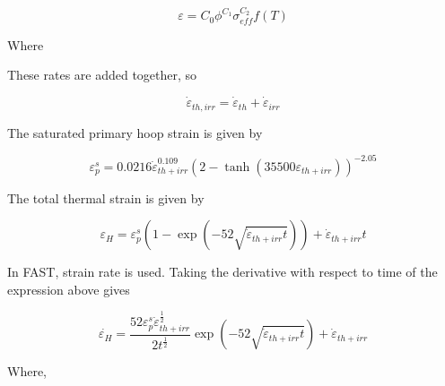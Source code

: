 \begin{equation}
    \label{eq:steady_state_irradiation_creep_rate}
    \varepsilon = C_{0}  \phi^{C_{1}}  \sigma^{C_{2}}_{eff}  f\left(T\right)
\end{equation}

Where


These rates are added together, so 

\begin{equation}
    \dot{\varepsilon}_{th,irr} = \dot{\varepsilon}_{th} + \dot{\varepsilon}_{irr}
    \label{eq:steady_state_total_creep_rate}
\end{equation}

The saturated primary hoop strain is given by

\begin{equation}
    \varepsilon^{s}_{p} = 0.0216  \dot{\varepsilon}^{0.109}_{th+irr}\left(2-\tanh\left(35500 \varepsilon_{th+irr}\right)\right)^{-2.05} 
    \label{eq:saturated_primary_hoop_strain}
\end{equation}

The total thermal strain is given by

\begin{equation}
    \varepsilon_{H}  = \varepsilon^{s}_{p} \left(1-\exp\left(-52\sqrt{\dot{\varepsilon}_{th+irr} t} \right)\right) + \dot{\varepsilon}_{th +irr} t
    \label{eq:total_thermal_strain}
\end{equation}

In FAST, strain rate is used. Taking the derivative with respect to time of the expression above
gives

\begin{equation}
    \dot{\varepsilon_{H}}  = \frac{52  \varepsilon^{s}_{p}  \dot{\varepsilon}^{\frac{1}{2}}_{th + irr}}{2  t^{\frac{1}{2}}} \exp\left(-52 \sqrt{\dot{\varepsilon}_{th+irr} t} \right) + \dot{\varepsilon}_{th+irr}
    \label{eq:strain_rate}
\end{equation}                

Where,

